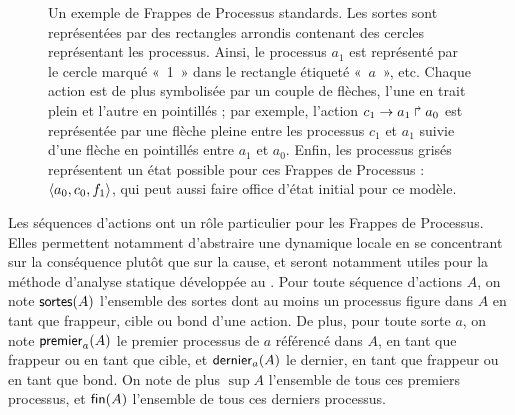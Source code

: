 \begin{example}
  \begin{figure}[ht]
  \begin{center}
  \caption{%
    Un exemple de Frappes de Processus standards.
    Les sortes sont représentées par des rectangles arrondis 
    contenant des cercles représentant les processus.
    Ainsi, le processus $a_1$ est représenté par le cercle marqué «~1~»
    dans le rectangle étiqueté «~$a$~», etc.
    Chaque action est de plus symbolisée par un couple de flèches,
    l'une en trait plein et l'autre en pointillés ;
    par exemple, l'action $c_1\rightarrow a_1\Rsh a_0$
    est représentée par une flèche pleine entre les processus $c_1$ et $a_1$
    suivie d'une flèche en pointillés entre $a_1$ et $a_0$.
    Enfin, les processus grisés représentent un état possible
    pour ces Frappes de Processus : $\mbox{$\langle a_0, c_0, f_1 \rangle$}$, qui peut aussi faire office
    d'état initial pour ce modèle.
  }
  \end{center}
  \end{figure}
\end{example}

Les séquences d'actions ont un rôle particulier pour les Frappes de Processus.
Elles permettent notamment d'abstraire une dynamique locale en se concentrant
sur la conséquence plutôt que sur la cause,
et seront notamment utiles pour la méthode d'analyse statique développée
au .
Pour toute séquence d'actions $A$,
on note $\mathsf{sortes}(A)$ l'ensemble des sortes dont au moins un processus figure dans $A$
en tant que frappeur, cible ou bond d'une action.
De plus, pour toute sorte $a$,
on note $\mathsf{premier}_{a}(A)$ le premier processus de $a$ référencé dans $A$,
en tant que frappeur ou en tant que cible,
et $\mathsf{dernier}_{a}(A)$ le dernier, en tant que frappeur ou en tant que bond.
On note de plus
$\sup{A}$ l'ensemble de tous ces premiers processus,
et $\mathsf{fin}(A)$ l'ensemble de tous ces derniers processus.

